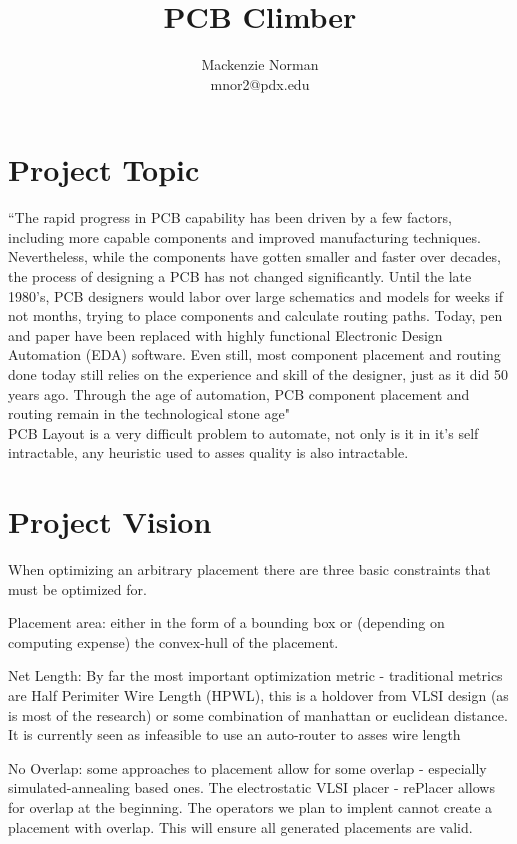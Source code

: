 \documentclass{article}
\title{PCB Climber}
\author{Mackenzie Norman\\ mnor2@pdx.edu}
\begin{document}
\maketitle
\section{Project Topic}

``The rapid progress in PCB capability has been driven by a few factors, including more capable components and improved manufacturing techniques. Nevertheless, while the components have gotten smaller and faster over decades, the process of designing a PCB has not changed significantly. Until the late 1980’s, PCB designers would labor over large schematics and models for weeks if not months, trying to place components and calculate routing paths. Today, pen and paper have been replaced with highly functional Electronic Design Automation (EDA) software. Even still, most component placement and routing done today still relies on the experience and skill of the designer, just as it did 50 years ago. Through the age of automation, PCB component placement and routing remain in the technological stone age" \\

PCB Layout is a very difficult problem to automate, not only is it in it's self intractable, any heuristic used to asses quality is also intractable.\\

\section{Project Vision}

When optimizing an arbitrary placement there are three basic constraints that must be optimized for.

Placement area: either in the form of a bounding box or (depending on computing expense) the convex-hull of the placement. 

Net Length: By far the most important optimization metric - traditional metrics are Half Perimiter Wire Length (HPWL), this is a holdover from VLSI design (as is most of the research) or some combination of manhattan or euclidean distance. It is currently seen as infeasible to use an auto-router to asses wire length

No Overlap: some approaches to placement allow for some overlap - especially simulated-annealing based ones. The electrostatic VLSI placer - rePlacer allows for overlap at the beginning. The operators we plan to implent cannot create a placement with overlap. This will ensure all generated placements are valid. 
\end{document}
